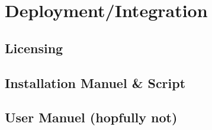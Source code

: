 \section{Deployment/Integration}

\subsection{Licensing}

\subsection{Installation Manuel \& Script}

\subsection{User Manuel (hopfully not)}



